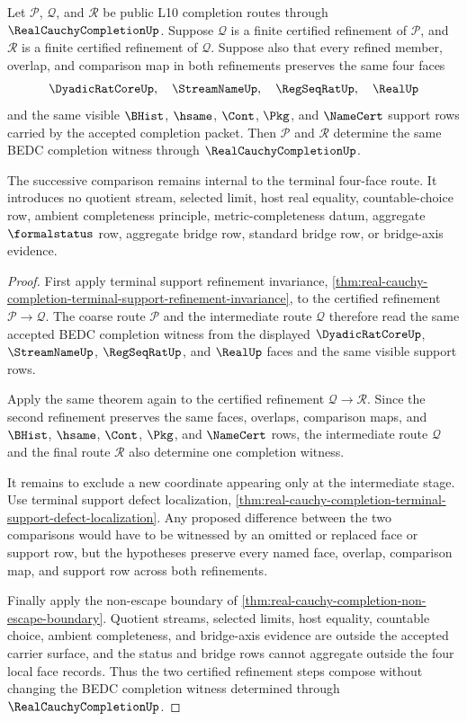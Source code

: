 \begin{theorem}
\label{thm:real-cauchy-completion-terminal-support-refinement-composition}
Let $\mathcal P$, $\mathcal Q$, and $\mathcal R$ be public L10 completion routes through $\RealCauchyCompletionUp$. Suppose $\mathcal Q$ is a finite certified refinement of $\mathcal P$, and $\mathcal R$ is a finite certified refinement of $\mathcal Q$. Suppose also that every refined member, overlap, and comparison map in both refinements preserves the same four faces
$$
\DyadicRatCoreUp,\quad \StreamNameUp,\quad \RegSeqRatUp,\quad \RealUp
$$
and the same visible $\BHist$, $\hsame$, $\Cont$, $\Pkg$, and $\NameCert$ support rows carried by the accepted completion packet. Then $\mathcal P$ and $\mathcal R$ determine the same BEDC completion witness through $\RealCauchyCompletionUp$.

The successive comparison remains internal to the terminal four-face route. It introduces no quotient stream, selected limit, host real equality, countable-choice row, ambient completeness principle, metric-completeness datum, aggregate $\formalstatus$ row, aggregate bridge row, standard bridge row, or bridge-axis evidence.
\end{theorem}
\begin{proof}
First apply terminal support refinement invariance, \autoref{thm:real-cauchy-completion-terminal-support-refinement-invariance}, to the certified refinement $\mathcal P \to \mathcal Q$. The coarse route $\mathcal P$ and the intermediate route $\mathcal Q$ therefore read the same accepted BEDC completion witness from the displayed $\DyadicRatCoreUp$, $\StreamNameUp$, $\RegSeqRatUp$, and $\RealUp$ faces and the same visible support rows.

Apply the same theorem again to the certified refinement $\mathcal Q \to \mathcal R$. Since the second refinement preserves the same faces, overlaps, comparison maps, and $\BHist$, $\hsame$, $\Cont$, $\Pkg$, and $\NameCert$ rows, the intermediate route $\mathcal Q$ and the final route $\mathcal R$ also determine one completion witness.

It remains to exclude a new coordinate appearing only at the intermediate stage. Use terminal support defect localization, \autoref{thm:real-cauchy-completion-terminal-support-defect-localization}. Any proposed difference between the two comparisons would have to be witnessed by an omitted or replaced face or support row, but the hypotheses preserve every named face, overlap, comparison map, and support row across both refinements.

Finally apply the non-escape boundary of \autoref{thm:real-cauchy-completion-non-escape-boundary}. Quotient streams, selected limits, host equality, countable choice, ambient completeness, and bridge-axis evidence are outside the accepted carrier surface, and the status and bridge rows cannot aggregate outside the four local face records. Thus the two certified refinement steps compose without changing the BEDC completion witness determined through $\RealCauchyCompletionUp$.
\end{proof}

